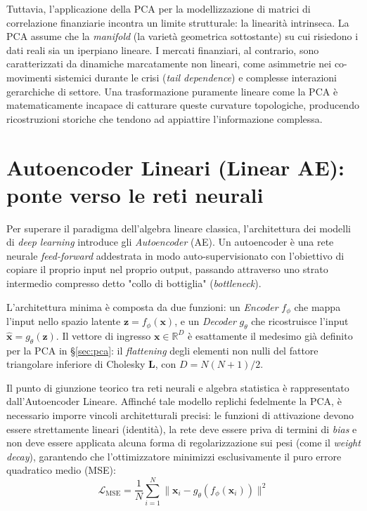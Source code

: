 Tuttavia, l'applicazione della PCA per la modellizzazione di matrici di correlazione finanziarie incontra un limite strutturale: la linearità intrinseca. La PCA assume che la \emph{manifold} (la varietà geometrica sottostante) su cui risiedono i dati reali sia un iperpiano lineare. I mercati finanziari, al contrario, sono caratterizzati da dinamiche marcatamente non lineari, come asimmetrie nei co-movimenti sistemici durante le crisi (\emph{tail dependence}) e complesse interazioni gerarchiche di settore. Una trasformazione puramente lineare come la PCA è matematicamente incapace di catturare queste curvature topologiche, producendo ricostruzioni storiche che tendono ad appiattire l'informazione complessa.

\section{Autoencoder Lineari (Linear AE): ponte verso le reti neurali}
\label{sec:linear_ae}

Per superare il paradigma dell'algebra lineare classica, l'architettura dei modelli di \emph{deep learning} introduce gli \emph{Autoencoder} (AE). Un autoencoder è una rete neurale \emph{feed-forward} addestrata in modo auto-supervisionato con l'obiettivo di copiare il proprio input nel proprio output, passando attraverso uno strato intermedio compresso detto "collo di bottiglia" (\emph{bottleneck}).

L'architettura minima è composta da due funzioni: un \emph{Encoder} $f_{\phi}$ che mappa l'input nello spazio latente $\mathbf{z} = f_{\phi}(\mathbf{x})$, e un \emph{Decoder} $g_{\theta}$ che ricostruisce l'input $\mathbf{\hat{x}} = g_{\theta}(\mathbf{z})$. Il vettore di ingresso $\mathbf{x} \in \mathbb{R}^D$ è esattamente il medesimo già definito per la PCA in \S\ref{sec:pca}: il \emph{flattening} degli elementi non nulli del fattore triangolare inferiore di Cholesky $\mathbf{L}$, con $D = N(N+1)/2$.

Il punto di giunzione teorico tra reti neurali e algebra statistica è rappresentato dall'Autoencoder Lineare. Affinché tale modello replichi fedelmente la PCA, è necessario imporre vincoli architetturali precisi: le funzioni di attivazione devono essere strettamente lineari (identità), la rete deve essere priva di termini di \emph{bias} e non deve essere applicata alcuna forma di regolarizzazione sui pesi (come il \emph{weight decay}), garantendo che l'ottimizzatore minimizzi esclusivamente il puro errore quadratico medio (MSE):
\begin{equation}
\mathcal{L}_{\text{MSE}} = \frac{1}{N} \sum_{i=1}^N \lVert \mathbf{x}_i - g_{\theta}(f_{\phi}(\mathbf{x}_i)) \rVert^2
\end{equation}

